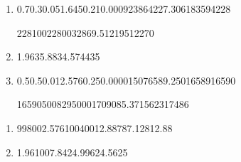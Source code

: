\begin{question}
    
    \begin{enumerate}[label={\textbf{\alph*)}}]

        \item 

              \begin{formula4}
                {0.7}{0.3}{0.05}{1.645}{0.21}{0.000923864}{227.306183594}{228}
              \end{formula4}

              \begin{formula5}
                {228}{100}{22800}{328}{69.512195122}{70}
              \end{formula5}

        \item 
              
              \begin{formula6} 
                {1.96}{3}{}{5.88}{34.5744}{35}
              \end{formula6}

        \item 

             \begin{formula4}
                {0.5}{0.5}{0.01}{2.576}{0.25}{0.00001507}{6589.25016589}{16590}
             \end{formula4}

             \begin{formula5}
                {16590}{500}{8295000}{17090}{85.371562317}{486}
             \end{formula5}

    \end{enumerate}
\end{question}


\begin{question}
    
    \begin{enumerate}[label={\textbf{\alph*)}}]

        \item 

              \begin{formula2}
                {99}{800}{2.576}{100}{400}{12.88}{787.12}{812.88}
              \end{formula2}

        \item 
              
              \begin{formula6} 
                {1.96}{100}{7.84}{24.99}{624.5}{625}
              \end{formula6}

    \end{enumerate}
\end{question}

